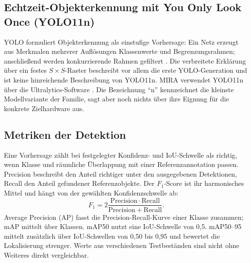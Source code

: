 \subsection{Echtzeit-Objekterkennung mit You Only Look Once (YOLO11n)}
YOLO formuliert Objekterkennung als einstufige Vorhersage: Ein Netz erzeugt aus Merkmalen mehrerer Auflösungen Klassenwerte und Begrenzungsrahmen; anschließend werden konkurrierende Rahmen gefiltert \cite{redmon2016yolo,neubeck2006efficient}. Die verbreitete Erklärung über ein festes $S\times S$-Raster beschreibt vor allem die erste YOLO-Generation und ist keine hinreichende Beschreibung von YOLO11n. MIRA verwendet YOLO11n über die Ultralytics-Software \cite{ultralyticsyolov8}. Die Bezeichnung \enquote{n} kennzeichnet die kleinste Modellvariante der Familie, sagt aber noch nichts über ihre Eignung für die konkrete Zielhardware aus.

\subsection{Metriken der Detektion}
Eine Vorhersage zählt bei festgelegter Konfidenz- und IoU-Schwelle als richtig, wenn Klasse und räumliche Überlappung mit einer Referenzannotation passen. Precision beschreibt den Anteil richtiger unter den ausgegebenen Detektionen, Recall den Anteil gefundener Referenzobjekte. Der $F_1$-Score ist ihr harmonisches Mittel und hängt von der gewählten Konfidenzschwelle ab:
\begin{equation}
F_1=2\frac{\mathrm{Precision}\cdot\mathrm{Recall}}{\mathrm{Precision}+\mathrm{Recall}}.
\end{equation}
Average Precision (AP) fasst die Precision-Recall-Kurve einer Klasse zusammen; mAP mittelt über Klassen. mAP50 nutzt eine IoU-Schwelle von 0,5. mAP50--95 mittelt zusätzlich über IoU-Schwellen von 0,50 bis 0,95 und bewertet die Lokalisierung strenger. Werte aus verschiedenen Testbeständen sind nicht ohne Weiteres direkt vergleichbar.
